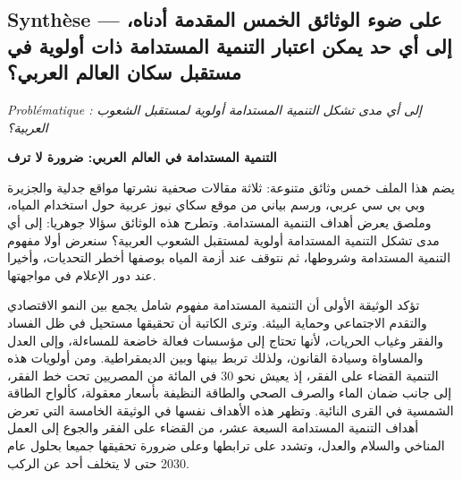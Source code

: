 \documentclass[11pt,a4paper]{article}
\begin{document}
\hypertarget{synthuxe8se-ux639ux644ux649-ux636ux648ux621-ux627ux644ux648ux62bux627ux626ux642-ux627ux644ux62eux645ux633-ux627ux644ux645ux642ux62fux645ux629-ux623ux62fux646ux627ux647-ux625ux644ux649-ux623ux64a-ux62dux62f-ux64aux645ux643ux646-ux627ux639ux62aux628ux627ux631-ux627ux644ux62aux646ux645ux64aux629-ux627ux644ux645ux633ux62aux62fux627ux645ux629-ux630ux627ux62a-ux623ux648ux644ux648ux64aux629-ux641ux64a-ux645ux633ux62aux642ux628ux644-ux633ux643ux627ux646-ux627ux644ux639ux627ux644ux645-ux627ux644ux639ux631ux628ux64a}{%
\subsection{Synthèse --- على ضوء الوثائق الخمس المقدمة أدناه، إلى أي حد يمكن اعتبار التنمية المستدامة ذات أولوية في مستقبل سكان العالم العربي؟}\label{synthuxe8se-ux639ux644ux649-ux636ux648ux621-ux627ux644ux648ux62bux627ux626ux642-ux627ux644ux62eux645ux633-ux627ux644ux645ux642ux62fux645ux629-ux623ux62fux646ux627ux647-ux625ux644ux649-ux623ux64a-ux62dux62f-ux64aux645ux643ux646-ux627ux639ux62aux628ux627ux631-ux627ux644ux62aux646ux645ux64aux629-ux627ux644ux645ux633ux62aux62fux627ux645ux629-ux630ux627ux62a-ux623ux648ux644ux648ux64aux629-ux641ux64a-ux645ux633ux62aux642ux628ux644-ux633ux643ux627ux646-ux627ux644ux639ux627ux644ux645-ux627ux644ux639ux631ux628ux64a}}

\emph{Problématique : إلى أي مدى تشكل التنمية المستدامة أولوية لمستقبل الشعوب العربية؟}

\textbf{التنمية المستدامة في العالم العربي: ضرورة لا ترف}

يضم هذا الملف خمس وثائق متنوعة: ثلاثة مقالات صحفية نشرتها مواقع جدلية والجزيرة وبي بي سي عربي، ورسم بياني من موقع سكاي نيوز عربية حول استخدام المياه، وملصق يعرض أهداف التنمية المستدامة. وتطرح هذه الوثائق سؤالا جوهريا: إلى أي مدى تشكل التنمية المستدامة أولوية لمستقبل الشعوب العربية؟ سنعرض أولا مفهوم التنمية المستدامة وشروطها، ثم نتوقف عند أزمة المياه بوصفها أخطر التحديات، وأخيرا عند دور الإعلام في مواجهتها.

تؤكد الوثيقة الأولى أن التنمية المستدامة مفهوم شامل يجمع بين النمو الاقتصادي والتقدم الاجتماعي وحماية البيئة. وترى الكاتبة أن تحقيقها مستحيل في ظل الفساد والفقر وغياب الحريات، لأنها تحتاج إلى مؤسسات فعالة خاضعة للمساءلة، وإلى العدل والمساواة وسيادة القانون، ولذلك تربط بينها وبين الديمقراطية. ومن أولويات هذه التنمية القضاء على الفقر، إذ يعيش نحو 30 في المائة من المصريين تحت خط الفقر، إلى جانب ضمان الماء والصرف الصحي والطاقة النظيفة بأسعار معقولة، كألواح الطاقة الشمسية في القرى النائية. وتظهر هذه الأهداف نفسها في الوثيقة الخامسة التي تعرض أهداف التنمية المستدامة السبعة عشر، من القضاء على الفقر والجوع إلى العمل المناخي والسلام والعدل، وتشدد على ترابطها وعلى ضرورة تحقيقها جميعا بحلول عام 2030 حتى لا يتخلف أحد عن الركب.
\end{document}
